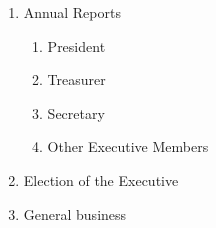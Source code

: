 \documentclass[11pt]{article}
\begin{document}
\begin{enumerate}[\thesection .1]
\begin{enumerate}[\hspace{5mm}1.]
    	\item Annual Reports
    	\begin{enumerate}
            \item President
            \item Treasurer
            \item Secretary
            \item Other Executive Members 
        \end{enumerate}
        \item Election of the Executive
        \item General business
    \end{enumerate}
\end{enumerate}
\end{document}
